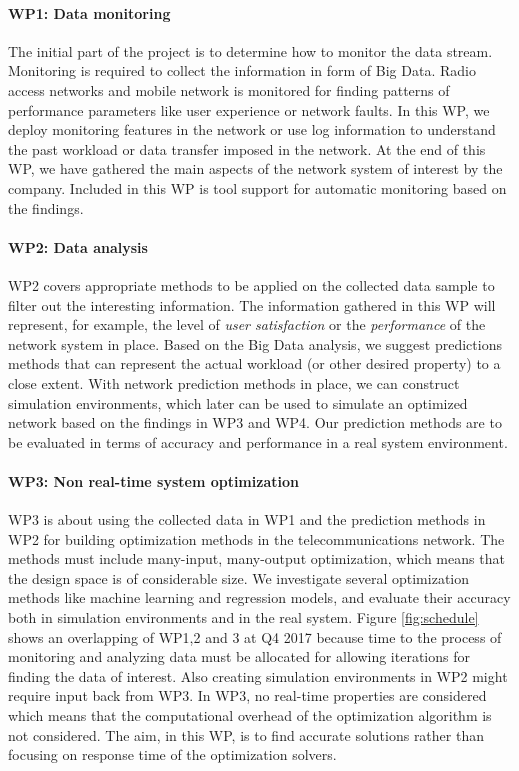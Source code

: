 \documentclass{article}
\begin{document}
\paragraph{WP1: Data monitoring}
The initial part of the project is to determine how to monitor the data stream.
Monitoring is required to collect the information in form of Big Data.
Radio access networks and mobile network is monitored for finding patterns of performance parameters like user experience or network faults. 
In this WP, we deploy monitoring features in the network or use log information to understand the past workload or data transfer imposed in the network.
At the end of this WP, we have gathered the main aspects of the network system of interest by the company.
Included in this WP is tool support for automatic monitoring based on the findings.
\paragraph{WP2: Data analysis}
WP2 covers appropriate methods to be applied on the collected data sample to filter out the interesting information.
The information gathered in this WP will represent, for example, the level of \textit{user satisfaction} or the \textit{performance} of the network system in place.
Based on the Big Data analysis, we suggest predictions methods that can represent the actual workload (or other desired property) to a close extent.
With network prediction methods in place, we can construct simulation environments, which later can be used to simulate an optimized network based on the findings in WP3 and WP4.
Our prediction methods are to be evaluated in terms of accuracy and performance in a real system environment.
\paragraph{WP3: Non real-time system optimization}
WP3 is about using the collected data in WP1 and the prediction methods in WP2 for building optimization methods in the telecommunications network.
The methods must include many-input, many-output optimization, which means that the design space is of considerable size.
We investigate several optimization methods like machine learning and regression models, and evaluate their accuracy both in simulation environments and in the real system.
Figure \ref{fig:schedule} shows an overlapping of WP1,2 and 3 at Q4 2017 because time to the process of monitoring and analyzing data must be allocated for allowing iterations for finding the data of interest.
Also creating simulation environments in WP2 might require input back from WP3.
In WP3, no real-time properties are considered which means that the computational overhead of the optimization algorithm is not considered.
The aim, in this WP, is to find accurate solutions rather than focusing on response time of the optimization solvers.
\end{document}
